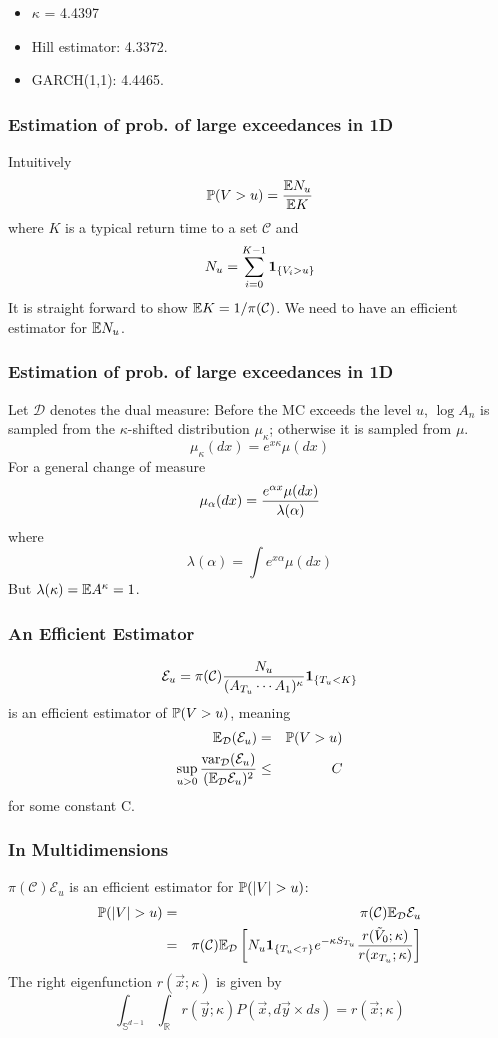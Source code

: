 \documentclass{beamer}
\begin{document}
\begin{frame}
   \begin{itemize}
   \item $\kappa$ = 4.4397
   \item Hill estimator: 4.3372.
   \item GARCH(1,1): 4.4465.
   \end{itemize}
 \end{frame}

 \begin{frame}
   \frametitle{Estimation of prob. of large exceedances in 1D}
   Intuitively
   \[
   \P(V > u) = {
     \E N_u
     \over
     \E K
   }
   \]
   where $K$ is a typical return time to a set $\mathcal C$ and
   \[
   N_u = \sum_{i=0}^{K - 1} \1{V_i > u}
   \]
   It is straight forward to show $\E K = 1/\pi(\mathcal C)$. We need to
   have an efficient estimator for $\E N_u$.
 \end{frame}

\begin{frame}
  \frametitle{Estimation of prob. of large exceedances in 1D}
  Let $\mathcal D$ denotes the dual measure:
  Before the MC exceeds the level $u$, $\log A_{n}$ is sampled from the
  $\kappa$-shifted distribution $\mu_\kappa$; otherwise it is sampled from
  $\mu$.
  \[
  \mu_\kappa(dx) = e^{x \kappa}\mu(dx)
  \]
  For a general change of measure
  \[
  \mu_\alpha(dx) = {
    e^{\alpha x}\mu(dx)
    \over
    \lambda(\alpha)
  }
  \]
  where
  \[
  \lambda(\alpha) = \int e^{x \alpha} \mu(dx)
  \]
  But $\lambda(\kappa) = \E A^\kappa = 1$.
\end{frame}

\begin{frame}
  \frametitle{An Efficient Estimator}
    \[
    \mathcal E_u = \pi(\mathcal C) {N_u
      \over
      (A_{T_u} \cdots A_1)^\kappa
    }\1{T_u < K}
    \]
    is an efficient estimator of $\P(V > u)$, meaning 
  \begin{eqnarray*}
    \E_{\mathcal D}(\mathcal E_u) &=& \P(V > u) \\
    \sup_{u > 0} {
      \var_{\mathcal D}(\mathcal E_u)
      \over
      (\E_{\mathcal D} \mathcal E_u)^2
    } &\leq& C
  \end{eqnarray*}
  for some constant C.
\end{frame}

\begin{frame}
  \frametitle{In Multidimensions}
  $\pi(\mathcal C)\mathcal E_u$ is an efficient estimator for $\P(|V|
  > u)$:
  \begin{eqnarray*}
    \P(|V| > u) &=& \pi(\mathcal C) \E_{\mathcal D} \mathcal E_u \\
    &=& \pi(\mathcal C) \E_{\mathcal D} \left[
      N_u \1{T_u < \tau} e^{-\kappa S_{T_u}} {r(\tilde V_0; \kappa)
        \over r(x_{T_u}; \kappa)}
    \right]
  \end{eqnarray*}
  The right eigenfunction $r(\vec x; \kappa)$ is given by
  \[
  \int_{\mathbb S^{d-1}} \int_{\mathbb R}
  r(\vec y; \kappa) P(\vec x, d\vec y \times ds) = r(\vec x; \kappa)
  \]
\end{frame}


\end{document}
